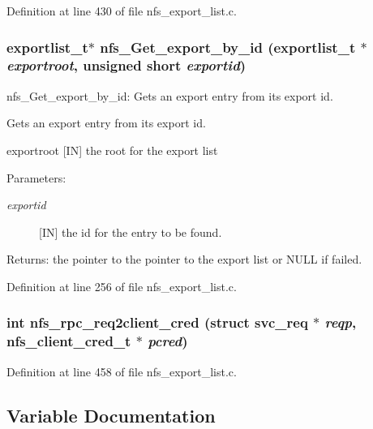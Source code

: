 Definition at line 430 of file nfs\_\-export\_\-list.c.
\subsubsection{\setlength{\rightskip}{0pt plus 5cm}exportlist\_\-t$\ast$ nfs\_\-Get\_\-export\_\-by\_\-id (exportlist\_\-t $\ast$ {\em exportroot}, unsigned short {\em exportid})}\label{nfs__export__list_8c_a2}


nfs\_\-Get\_\-export\_\-by\_\-id: Gets an export entry from its export id.

Gets an export entry from its export id.

exportroot [IN] the root for the export list \begin{Desc}
\item[Parameters:]
\begin{description}
\item[{\em exportid}][IN] the id for the entry to be found.\end{description}
\end{Desc}
\begin{Desc}
\item[Returns:]the pointer to the pointer to the export list or NULL if failed. \end{Desc}


Definition at line 256 of file nfs\_\-export\_\-list.c.
\subsubsection{\setlength{\rightskip}{0pt plus 5cm}int nfs\_\-rpc\_\-req2client\_\-cred (struct svc\_\-req $\ast$ {\em reqp}, nfs\_\-client\_\-cred\_\-t $\ast$ {\em pcred})}\label{nfs__export__list_8c_a5}




Definition at line 458 of file nfs\_\-export\_\-list.c.

\subsection{Variable Documentation}
